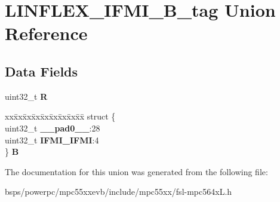 \hypertarget{unionLINFLEX__IFMI__32B__tag}{}\section{L\+I\+N\+F\+L\+E\+X\+\_\+\+I\+F\+M\+I\+\_\+B\+\_\+tag Union Reference}
\label{unionLINFLEX__IFMI__32B__tag}
\subsection*{Data Fields}
\begin{DoxyCompactItemize}
\item 
\mbox{\label{unionLINFLEX__IFMI__32B__tag_a194e3bd3d77cafc161b45fcde1178347}} 
uint32\+\_\+t {\bfseries R}
\item 
\mbox{\label{unionLINFLEX__IFMI__32B__tag_ac924b55c35de298de6d1e9f3861feabf}} 
\begin{tabbing}
xx\=xx\=xx\=xx\=xx\=xx\=xx\=xx\=xx\=\kill
struct \{\\
\>uint32\_t {\bfseries \_\_pad0\_\_}:28\\
\>uint32\_t {\bfseries IFMI\_IFMI}:4\\
\} {\bfseries B}\\

\end{tabbing}\end{DoxyCompactItemize}


The documentation for this union was generated from the following file\+:\begin{DoxyCompactItemize}
\item 
bsps/powerpc/mpc55xxevb/include/mpc55xx/fsl-\/mpc564x\+L.\+h\end{DoxyCompactItemize}
